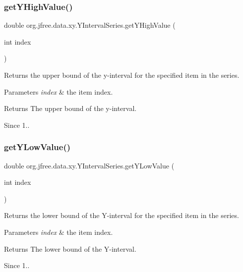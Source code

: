 \subsubsection{\texorpdfstring{get\+Y\+High\+Value()}{getYHighValue()}}
{\footnotesize\ttfamily double org.\+jfree.\+data.\+xy.\+Y\+Interval\+Series.\+get\+Y\+High\+Value (\begin{DoxyParamCaption}\item[{int}]{index }\end{DoxyParamCaption})}

Returns the upper bound of the y-\/interval for the specified item in the series.


\begin{DoxyParams}{Parameters}
{\em index} & the item index.\\
\hline
\end{DoxyParams}
\begin{DoxyReturn}{Returns}
The upper bound of the y-\/interval.
\end{DoxyReturn}
\begin{DoxySince}{Since}
1.. 
\end{DoxySince}
\mbox{\label{classorg_1_1jfree_1_1data_1_1xy_1_1_y_interval_series_a39443307d90610019eb56eb6def9ea7a}} 
\subsubsection{\texorpdfstring{get\+Y\+Low\+Value()}{getYLowValue()}}
{\footnotesize\ttfamily double org.\+jfree.\+data.\+xy.\+Y\+Interval\+Series.\+get\+Y\+Low\+Value (\begin{DoxyParamCaption}\item[{int}]{index }\end{DoxyParamCaption})}

Returns the lower bound of the Y-\/interval for the specified item in the series.


\begin{DoxyParams}{Parameters}
{\em index} & the item index.\\
\hline
\end{DoxyParams}
\begin{DoxyReturn}{Returns}
The lower bound of the Y-\/interval.
\end{DoxyReturn}
\begin{DoxySince}{Since}
1.. 
\end{DoxySince}
\mbox{\label{classorg_1_1jfree_1_1data_1_1xy_1_1_y_interval_series_a883639c512416c2e570062999e403158}} 
